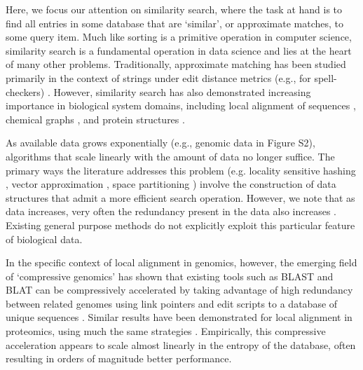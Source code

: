 \documentclass[review,preprint,12pt]{elsarticle}
\renewcommand{\cite}{\citep} %
\theoremstyle{definition}
\theoremstyle{remark}
\numberwithin{equation}{section}
\begin{document}
Here, we focus our attention on similarity search, where the task at hand is to find all entries in some database that are `similar', or approximate matches, to some query item.
Much like sorting is a primitive operation in computer science, similarity search is a fundamental operation in data science and lies at the heart of many other problems.
Traditionally, approximate matching has been studied primarily in the context of strings under edit distance metrics (e.g., for spell-checkers) \cite{ukkonen1985algorithms}.
However, similarity search has also demonstrated increasing importance in biological system domains, including local alignment of sequences \cite{altschul1990basic, kent2002blat}, chemical graphs \cite{schaeffer2007graph}, and protein structures \cite{budowski2010fragbag}.

As available data grows exponentially \cite{berger2013computational,yu2015quality} (e.g., genomic data in Figure S2), 
algorithms that scale linearly with the amount of data no longer suffice.
The primary ways the literature addresses this problem (e.g.
locality sensitive hashing \cite{indyk1998approximate}, vector approximation \cite{ferhatosmanoglu2000vector}, space partitioning \cite{weber1998quantitative}) involve the construction of data structures that admit a more efficient search operation.
However, we note that as data increases, very often the redundancy present in the data also increases \cite{loh2012compressive}.
Existing general purpose methods do not explicitly exploit this particular feature of biological data.

In the specific context of local alignment in genomics, however, the emerging field of `compressive genomics' has shown that existing tools such as BLAST and BLAT can be compressively accelerated by taking advantage of high redundancy between related genomes using link pointers and edit scripts to a database of unique sequences \cite{loh2012compressive}.
Similar results have been demonstrated for local alignment in proteomics, using much the same strategies \cite{daniels2013compressive}.
Empirically, this compressive acceleration appears to scale almost linearly in the entropy of the database, often resulting in orders of magnitude better performance.
\end{document}
